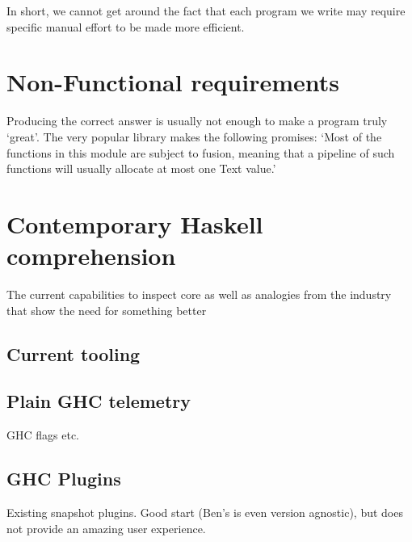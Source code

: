 In short, we cannot get around the fact that each program we write may require specific manual
effort to be made more efficient.

\section{Non-Functional requirements}

Producing the correct answer is usually not enough to make a program truly `great'.
The very popular  library makes the following promises: `Most of the functions in this module are subject to
fusion, meaning that a pipeline of such functions will usually allocate at most one Text value.' \cite{functional_testing}


\section{Contemporary Haskell comprehension}

The current capabilities to inspect core as well as analogies from the industry that show the need for something better

\subsection{Current tooling}

\subsection{Plain GHC telemetry}
GHC flags etc.
\subsection{GHC Plugins}
Existing snapshot plugins. Good start (Ben's is even version agnostic), but does not provide an amazing user experience.
